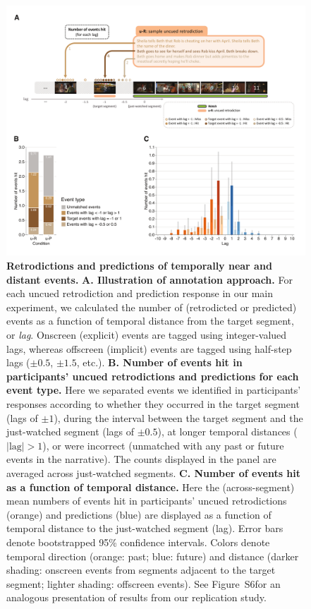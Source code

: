 \documentclass[10pt]{article}
\newcommand{\hitRates}{S6}
\begin{document}
\begin{figure}[tp]
  \centering
  \includegraphics[width=\textwidth]{results2}

  \caption{\textbf{Retrodictions and predictions of temporally near and distant
  events.} \textbf{A. Illustration of annotation approach.} For each uncued
  retrodiction and prediction response in our main experiment, we calculated
  the number of (retrodicted or predicted) events as a function of temporal
  distance from the target segment, or \textit{lag}. Onscreen (explicit) events
  are tagged using integer-valued lags, whereas offscreen (implicit) events are
  tagged using half-step lags ($\pm 0.5$, $\pm 1.5$, etc.). \textbf{B. Number
  of events hit in participants' uncued retrodictions and predictions for each
  event type.} Here we separated events we identified in participants'
  responses according to whether they occurred in the target segment (lags of
  $\pm 1$), during the interval between the target segment and the just-watched
  segment (lags of $\pm 0.5$), at longer temporal distances ($|\mathrm{lag}| >
  1$), or were incorrect (unmatched with any past or future events in the
  narrative). The counts displayed in the panel are averaged across
  just-watched segments. \textbf{C. Number of events hit as a function of
  temporal distance.} Here the (across-segment) mean numbers of events hit in
  participants' uncued retrodictions (orange) and predictions (blue) are
  displayed as a function of temporal distance to the just-watched segment
  (lag). Error bars denote bootstrapped 95\% confidence intervals. Colors
  denote temporal direction (orange: past; blue: future) and distance (darker
  shading: onscreen events from segments adjacent to the target segment;
  lighter shading: offscreen events). See Figure~\hitRates for an analogous
  presentation of results from our replication study.}

  \label{fig:result2}
\end{figure}
\end{document}
